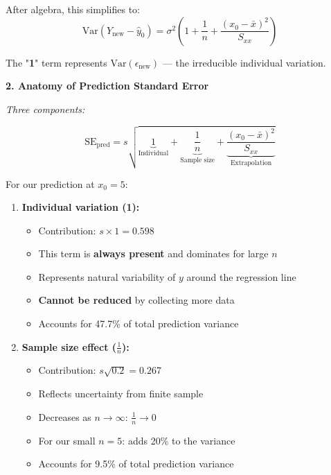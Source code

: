 \documentclass[12pt]{article}
\begin{document}
\begin{explanation}
After algebra, this simplifies to:
\[
\text{Var}(Y_{\text{new}} - \hat{y}_0) = \sigma^2\left(1 + \frac{1}{n} + \frac{(x_0 - \bar{x})^2}{S_{xx}}\right)
\]

The "\textbf{1}" term represents $\text{Var}(\epsilon_{\text{new}})$ — the irreducible individual variation.

\textbf{2. Anatomy of Prediction Standard Error}

\textit{Three components:}

\[
\text{SE}_{\text{pred}} = s\sqrt{\underbrace{1}_{\text{Individual}} + \underbrace{\frac{1}{n}}_{\text{Sample size}} + \underbrace{\frac{(x_0-\bar{x})^2}{S_{xx}}}_{\text{Extrapolation}}}
\]

For our prediction at $x_0 = 5$:

\begin{enumerate}
    \item \textbf{Individual variation (1):}
    \begin{itemize}
        \item Contribution: $s \times 1 = 0.598$
        \item This term is \textbf{always present} and dominates for large $n$
        \item Represents natural variability of $y$ around the regression line
        \item \textbf{Cannot be reduced} by collecting more data
        \item Accounts for 47.7\% of total prediction variance
    \end{itemize}

    \item \textbf{Sample size effect ($\frac{1}{n}$):}
    \begin{itemize}
        \item Contribution: $s\sqrt{0.2} = 0.267$
        \item Reflects uncertainty from finite sample
        \item Decreases as $n \to \infty$: $\frac{1}{n} \to 0$
        \item For our small $n = 5$: adds 20\% to the variance
        \item Accounts for 9.5\% of total prediction variance
    \end{itemize}


\end{enumerate}
\end{explanation}
\end{document}
